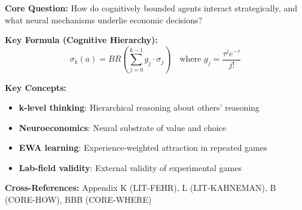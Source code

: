 \begin{tcolorbox}[colback=blue!5!white, colframe=blue!75!black,
    title=Quick Reference: LIT-CAMERER]

\textbf{Core Question:} How do cognitively bounded agents interact strategically, and what neural mechanisms underlie economic decisions?

\textbf{Key Formula (Cognitive Hierarchy):}
\begin{equation}
\sigma_k(a) = BR\left(\sum_{j=0}^{k-1} g_j \cdot \sigma_j\right) \quad \text{where } g_j = \frac{\tau^j e^{-\tau}}{j!}
\end{equation}

\textbf{Key Concepts:}
\begin{itemize}[nosep]
\item \textbf{k-level thinking}: Hierarchical reasoning about others' reasoning
\item \textbf{Neuroeconomics}: Neural substrate of value and choice
\item \textbf{EWA learning}: Experience-weighted attraction in repeated games
\item \textbf{Lab-field validity}: External validity of experimental games
\end{itemize}

\textbf{Cross-References:} Appendix K (LIT-FEHR), L (LIT-KAHNEMAN), B (CORE-HOW), BBB (CORE-WHERE)
\end{tcolorbox}


